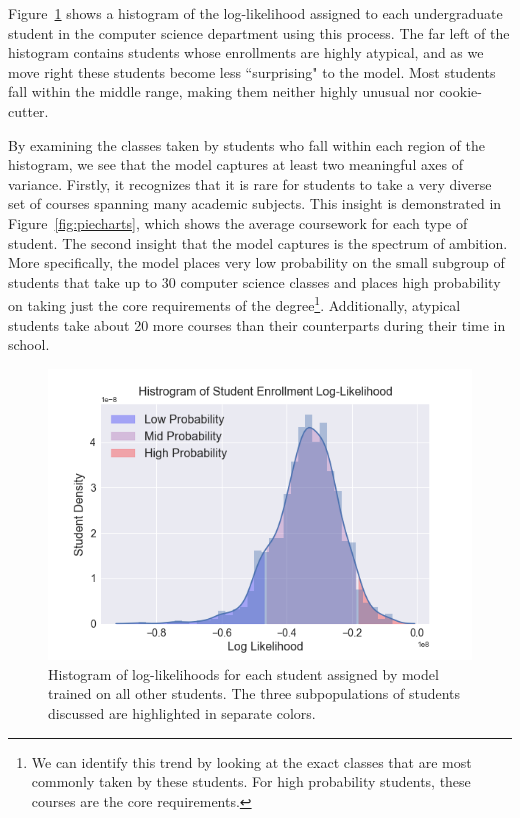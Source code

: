 \documentclass{edm_template}
\begin{document}
Figure~\ref{fig:likelihistogram} shows a histogram of the log-likelihood assigned to each undergraduate student in the computer science department using this process. The far left of the histogram contains students whose enrollments are highly atypical, and as we move right these students become less ``surprising" to the model. Most students fall within the middle range, making them neither highly unusual nor cookie-cutter.

By examining the classes taken by students who fall within each region of the histogram, we see that the model captures at least two meaningful axes of variance. Firstly, it recognizes that it is rare for students to take a very diverse set of courses spanning many academic subjects. This insight is demonstrated in Figure~\ref{fig:piecharts}, which shows the average coursework for each type of student. The second insight that the model captures is the spectrum of ambition. More specifically, the model places very low probability on the small subgroup of students that take up to 30 computer science classes and places high probability on taking just the core requirements of the degree\footnote{We can identify this trend by looking at the exact classes that are most commonly taken by these students. For high probability students, these courses are the core requirements.}. Additionally, atypical students take about 20 more courses than their counterparts during their time in school. 

\begin{figure}
    \centering
    \includegraphics[scale=0.4]{figures/loglikelihood_hist.png}
    \caption{\label{fig:likelihistogram} Histogram of log-likelihoods for each student assigned by model trained on all other students. The three subpopulations of students discussed are highlighted in separate colors.}
\end{figure}
\end{document}
